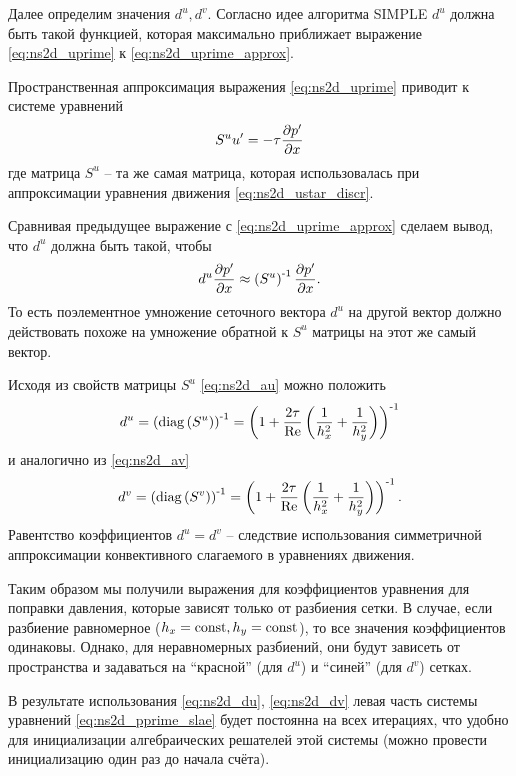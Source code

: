 Далее определим значения $d^u, d^v$.
Согласно идее алгоритма SIMPLE $d^u$ должна
быть такой функцией, которая максимально приближает
выражение \eqref{eq:ns2d_uprime} к \eqref{eq:ns2d_uprime_approx}.

Пространственная аппроксимация выражения \eqref{eq:ns2d_uprime}
приводит к системе уравнений
\begin{equation*}
    S^u u' = -\tau\frac{\partial p'}{\partial x}
\end{equation*}
где матрица $S^u$ -- та же самая матрица, которая использовалась
при аппроксимации уравнения движения \eqref{eq:ns2d_ustar_discr}.

Сравнивая предыдущее выражение с \eqref{eq:ns2d_uprime_approx}
сделаем вывод, что $d^u$ должна быть такой, чтобы
\begin{equation*}
    d^u \frac{\partial p'}{\partial x} \approx \left(S^u\right)^{\text{-} 1} \frac{\partial p'}{\partial x}.
\end{equation*}
То есть поэлементное умножение сеточного вектора ${d^u}$ 
на другой вектор
должно действовать похоже на умножение обратной к $S^u$ матрицы на этот же самый вектор.

Исходя из свойств матрицы $S^u$ \eqref{eq:ns2d_au} можно
положить 
\begin{equation}
    \label{eq:ns2d_du}
    d^u = \left({\rm diag}\left(S^u\right)\right)^{\text{-} 1} = 
        \left(1 + \frac{2\tau}{\mathrm{Re}}\left(\frac{1}{h_x^2} + \frac{1}{h_y^2}\right)\right)^{\text{-} 1}
\end{equation}
и аналогично из \eqref{eq:ns2d_av}
\begin{equation}
    \label{eq:ns2d_dv}
    d^v = \left({\rm diag}\left(S^v\right) \right)^{\text{-} 1}= 
        \left(1 + \frac{2\tau}{\mathrm{Re}}\left(\frac{1}{h_x^2} + \frac{1}{h_y^2}\right)\right)^{\text{-} 1}.
\end{equation}
Равентство коэффициентов $d^u = d^v$ -- следствие использования симметричной
аппроксимации конвективного слагаемого в уравнениях движения.

Таким образом мы получили выражения для коэффициентов уравнения для поправки давления,
которые зависят только от разбиения сетки.
В случае, если разбиение равномерное ($h_x = {\rm const}, h_y = {\rm const}$),
то все значения коэффициентов одинаковы.
Однако, для неравномерных разбиений, они будут зависеть
от пространства и задаваться на ``красной'' (для $d^u$) и ``синей'' (для $d^v$)
сетках.

В результате использования \eqref{eq:ns2d_du}, \eqref{eq:ns2d_dv} левая часть системы уравнений \eqref{eq:ns2d_pprime_slae}
будет постоянна на всех итерациях, что удобно для инициализации алгебраических решателей этой системы
(можно провести инициализацию один раз до начала счёта).

